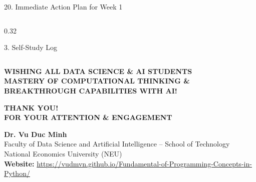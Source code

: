 \documentclass[aspectratio=169, 10pt]{beamer}
\begin{document}
\begin{frame}{20. Immediate Action Plan for Week 1}
\begin{columns}[T]
\begin{column}{0.32\textwidth}
\begin{cbox}[accentorange]{3. Self-Study Log}
\begin{itemize}
        \end{itemize}
      \end{cbox}
    \end{column}
  \end{columns}
  \vspace{0.2cm}
  \begin{tcolorbox}[colback=primaryblue!5, colframe=primaryblue, arc=3pt, left=8pt, right=8pt, top=6pt, bottom=6pt]
    \centering\small
    \textbf{\textcolor{primaryblue}{WISHING ALL DATA SCIENCE \& AI STUDENTS}}\\[3pt]
    \textbf{\textcolor{secondarygreen}{MASTERY OF COMPUTATIONAL THINKING \& BREAKTHROUGH CAPABILITIES WITH AI!}}
  \end{tcolorbox}
\end{frame}

\begin{frame}[plain]
  \vfill
  \centering
  {\Huge\textbf{\textcolor{primaryblue}{THANK YOU!}}}\\[8pt]
  {\Large\textbf{\textcolor{secondarygreen}{FOR YOUR ATTENTION \& ENGAGEMENT}}}\\[15pt]

  \begin{tcolorbox}[colback=white, colframe=primaryblue, arc=4pt, width=0.82\textwidth, left=10pt, right=10pt, top=8pt, bottom=8pt]
    \centering\footnotesize
    \textbf{\normalsize Dr. Vu Duc Minh}\\[3pt]
    Faculty of Data Science and Artificial Intelligence -- School of Technology\\
    National Economics University (NEU)\\[6pt]
    \textbf{Website:} \url{https://vudmvn.github.io/Fundamental-of-Programming-Concepts-in-Python/}

  \end{tcolorbox}
  \vfill
\end{frame}
\end{document}
